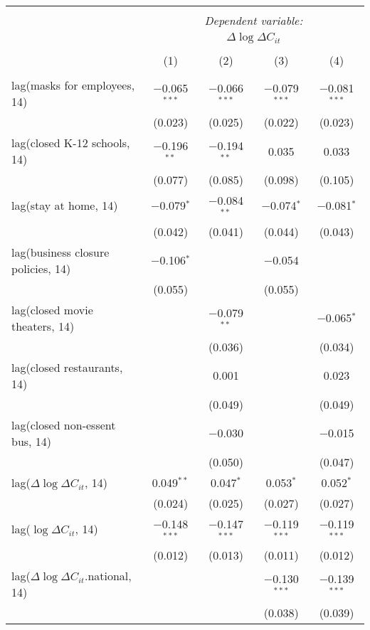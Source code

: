 \begin{tabular}{@{\extracolsep{1pt}}lcccc} 
\\[-1.8ex]\hline 
\hline \\[-1.8ex] 
 & \multicolumn{4}{c}{\textit{Dependent variable:}} \\ 
\cline{2-5} 
 & \multicolumn{4}{c}{$\Delta \log \Delta C_{it}$} \\ 
\\[-1.8ex] & (1) & (2) & (3) & (4)\\ 
\hline \\[-1.8ex] 
 lag(masks for employees, 14) & $-$0.065$^{***}$ & $-$0.066$^{***}$ & $-$0.079$^{***}$ & $-$0.081$^{***}$ \\ 
  & (0.023) & (0.025) & (0.022) & (0.023) \\ 
  lag(closed K-12 schools, 14) & $-$0.196$^{**}$ & $-$0.194$^{**}$ & 0.035 & 0.033 \\ 
  & (0.077) & (0.085) & (0.098) & (0.105) \\ 
  lag(stay at home, 14) & $-$0.079$^{*}$ & $-$0.084$^{**}$ & $-$0.074$^{*}$ & $-$0.081$^{*}$ \\ 
  & (0.042) & (0.041) & (0.044) & (0.043) \\ 
  lag(business closure policies, 14) & $-$0.106$^{*}$ &  & $-$0.054 &  \\ 
  & (0.055) &  & (0.055) &  \\ 
  lag(closed movie theaters, 14) &  & $-$0.079$^{**}$ &  & $-$0.065$^{*}$ \\ 
  &  & (0.036) &  & (0.034) \\ 
  lag(closed restaurants, 14) &  & 0.001 &  & 0.023 \\ 
  &  & (0.049) &  & (0.049) \\ 
  lag(closed non-essent bus, 14) &  & $-$0.030 &  & $-$0.015 \\ 
  &  & (0.050) &  & (0.047) \\ 
  lag($\Delta \log \Delta C_{it}$, 14) & 0.049$^{**}$ & 0.047$^{*}$ & 0.053$^{*}$ & 0.052$^{*}$ \\ 
  & (0.024) & (0.025) & (0.027) & (0.027) \\ 
  lag($\log \Delta C_{it}$, 14) & $-$0.148$^{***}$ & $-$0.147$^{***}$ & $-$0.119$^{***}$ & $-$0.119$^{***}$ \\ 
  & (0.012) & (0.013) & (0.011) & (0.012) \\ 
  lag($\Delta \log \Delta C_{it}$.national, 14) &  &  & $-$0.130$^{***}$ & $-$0.139$^{***}$ \\ 
  &  &  & (0.038) & (0.039) \\ 

\end{tabular}
